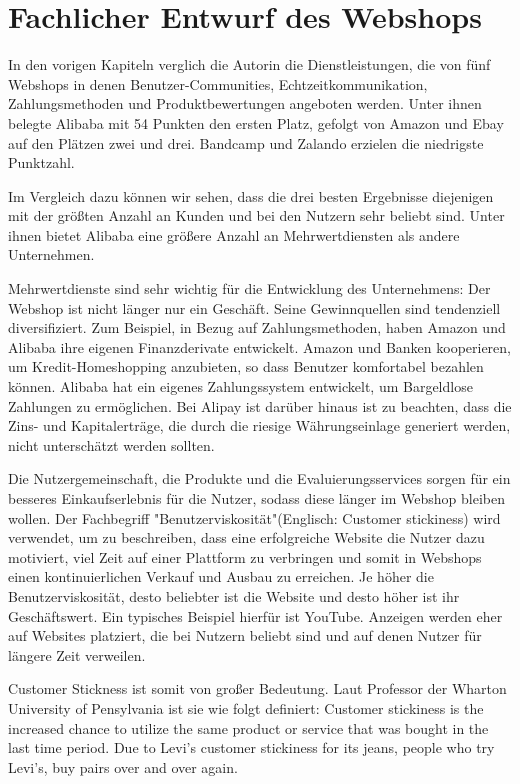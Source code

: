 
\chapter{Fachlicher Entwurf des Webshops}

In den vorigen Kapiteln verglich die Autorin die Dienstleistungen, die von fünf Webshops in denen Benutzer-Communities, Echtzeitkommunikation, Zahlungsmethoden und Produktbewertungen angeboten werden. Unter ihnen belegte Alibaba mit 54 Punkten den ersten Platz, gefolgt von Amazon und Ebay auf den Plätzen zwei und drei. Bandcamp und Zalando erzielen die niedrigste Punktzahl.

Im Vergleich dazu können wir sehen, dass die drei besten Ergebnisse diejenigen mit der größten Anzahl an Kunden und bei den Nutzern sehr beliebt sind. Unter ihnen bietet Alibaba eine größere Anzahl an Mehrwertdiensten als andere Unternehmen.

Mehrwertdienste sind sehr wichtig für die Entwicklung des Unternehmens: Der Webshop ist nicht länger nur ein Geschäft. Seine Gewinnquellen sind tendenziell diversifiziert. Zum Beispiel, in Bezug auf Zahlungsmethoden, haben Amazon und Alibaba ihre eigenen Finanzderivate entwickelt. Amazon und Banken kooperieren, um Kredit-Homeshopping anzubieten, so dass Benutzer komfortabel bezahlen können. Alibaba hat ein eigenes Zahlungssystem entwickelt, um \glqq{}Bargeldlose\grqq{} Zahlungen zu ermöglichen. Bei Alipay ist darüber hinaus ist zu beachten, dass die Zins- und Kapitalerträge, die durch die riesige Währungseinlage generiert werden, nicht unterschätzt werden sollten.

Die Nutzergemeinschaft, die Produkte und die Evaluierungsservices sorgen für ein besseres Einkaufserlebnis für die Nutzer, sodass diese länger im Webshop bleiben wollen. Der Fachbegriff "Benutzerviskosität"(Englisch: Customer stickiness) wird verwendet, um zu beschreiben, dass eine erfolgreiche Website die Nutzer dazu motiviert, viel Zeit auf einer Plattform zu verbringen und somit in Webshops einen kontinuierlichen Verkauf und Ausbau zu erreichen. Je höher die Benutzerviskosität, desto beliebter ist die Website und desto höher ist ihr Geschäftswert. Ein typisches Beispiel hierfür ist YouTube. Anzeigen werden eher auf Websites platziert, die bei Nutzern beliebt sind und auf denen Nutzer für längere Zeit verweilen.

Customer Stickness ist somit von großer Bedeutung. Laut \textcite{bradlow-wharton} Professor der Wharton University of Pensylvania ist sie wie folgt definiert: \glqq{}Customer stickiness is the increased chance to utilize the same product or service that was bought in the last time period. Due to Levi’s customer stickiness for its jeans, people who try Levi’s, buy pairs over and over again.\grqq{}


